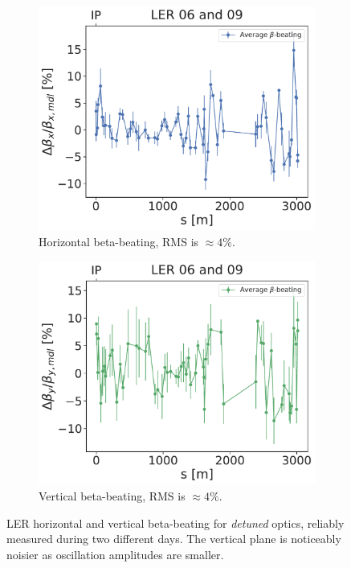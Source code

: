 \begin{figure}[!htb]
    \centering
    \begin{subfigure}[b]{0.48\textwidth}
        \includegraphics[width=\linewidth]{images/kek/ler_06_09_bet_x.pdf}
        \caption{Horizontal beta-beating, RMS is $\approx 4\%$.}
    \end{subfigure}
    \hfill
    \begin{subfigure}[b]{0.48\textwidth}
        \includegraphics[width=\linewidth]{images/kek/ler_06_09_bet_y.pdf}
        \caption{Vertical beta-beating, RMS is $\approx 4\%$.}
    \end{subfigure}
    \caption{LER horizontal and vertical beta-beating for \textit{detuned} optics, reliably measured
    during two different days.  The vertical plane is noticeably noisier as oscillation amplitudes
    are smaller.}
    \label{fig:kek:beating_ler_detuned}
\end{figure}


